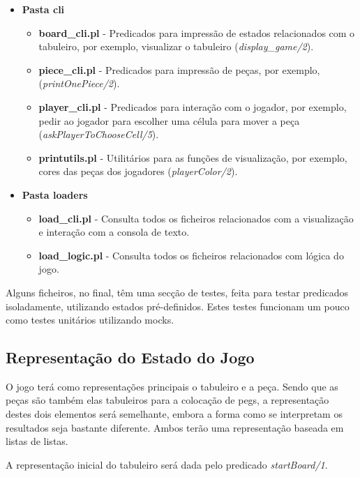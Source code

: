 \documentclass[paper=a4, fontsize=11pt]{scrartcl} %
\numberwithin{equation}{section} %
\numberwithin{figure}{section} %
\numberwithin{table}{section} %
\begin{document}
\begin{itemize}
\begin{itemize}
\begin{itemize}
			\end{itemize}
	\end{itemize}
	 \item \textbf{Pasta cli}
	 	\begin{itemize}
	 				\item \textbf{board\_cli.pl} - Predicados para impressão de estados relacionados com o tabuleiro, por exemplo, visualizar o tabuleiro (\textit{display\_game/2}).
	 				\item \textbf{piece\_cli.pl} - Predicados para impressão de peças, por exemplo, (\textit{printOnePiece/2}).
	 				\item \textbf{player\_cli.pl} - Predicados para interação com o jogador, por exemplo, pedir ao jogador para escolher uma célula para mover a peça (\textit{askPlayerToChooseCell/5}).
	 				\item \textbf{printutils.pl} - Utilitários para as funções de visualização, por exemplo, cores das peças dos jogadores (\textit{playerColor/2}).
	 	\end{itemize}
	 \item \textbf{Pasta loaders}	 	 
	 	\begin{itemize}
	 		\item \textbf{load\_cli.pl} - Consulta todos os ficheiros relacionados com a visualização e interação com a consola de texto.
	 		\item \textbf{load\_logic.pl} - Consulta todos os ficheiros relacionados com lógica do jogo.
		\end{itemize}	 	 	 	 
\end{itemize}

Alguns ficheiros, no final, têm uma secção de testes, feita para testar predicados isoladamente, utilizando estados pré-definidos. Estes testes funcionam um pouco como testes unitários utilizando mocks.


\subsection{Representação do Estado do Jogo}  \label{repjogo}

O jogo terá como representações principais o tabuleiro e a peça. Sendo que as peças são também elas tabuleiros para a colocação de pegs, a representação destes dois elementos será semelhante, embora a forma como se interpretam os resultados seja bastante diferente. Ambos terão uma representação baseada em listas de listas.

A representação inicial do tabuleiro será dada pelo predicado \textit{startBoard/1}.
\end{document}
